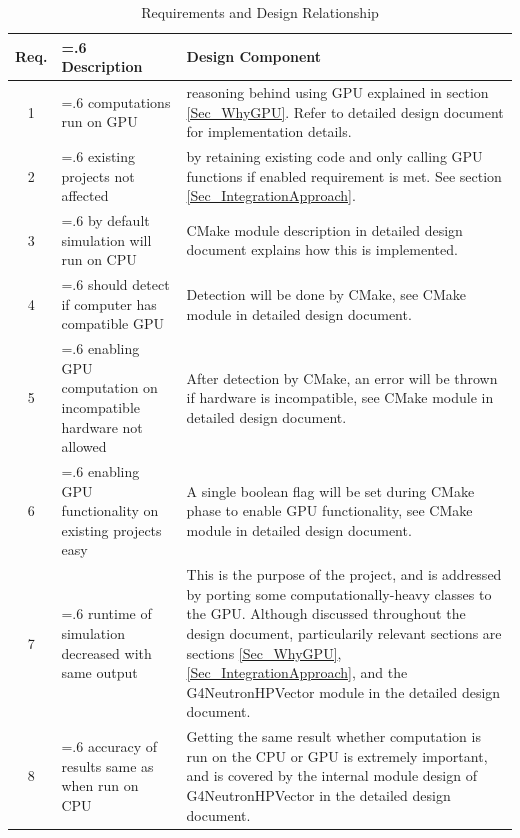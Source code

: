 \documentclass[12pt]{article}
\begin{document}
\begin{table}[h]
\centering
\caption{Requirements and Design Relationship}\label{Table_RequirementsAndDesign}

\begin{tabularx}{\textwidth}{c>{\hsize=.6\hsize}X>{\hsize=1.4\hsize}X}
\toprule
\bf Req. & \bf Description & \bf Design Component\\\midrule
\arrayrulecolor{lightgray}
1  & computations run on GPU & reasoning behind using GPU explained in section \ref{Sec_WhyGPU}. Refer to detailed design document for implementation details.\\\hline

2  & existing projects not affected & by retaining existing code and only calling GPU functions if enabled requirement is met. See section \ref{Sec_IntegrationApproach}.\\\hline

3  & by default simulation will run on CPU & CMake module description in detailed design document explains how this is implemented.\\\hline

4  & should detect if computer has compatible GPU & Detection will be done by CMake, see CMake module in detailed design document.\\\hline

5  & enabling GPU computation on incompatible hardware not allowed & After detection by CMake, an error will be thrown if hardware is incompatible, see CMake module in detailed design document.\\\hline

6  & enabling GPU functionality on existing projects easy & A single boolean flag will be set during CMake phase to enable GPU functionality, see CMake module in detailed design document.\\\hline

7 & runtime of simulation decreased with same output & This is the purpose of the project, and is addressed by porting some computationally-heavy classes to the GPU. Although discussed throughout the design document, particularily relevant sections are sections \ref{Sec_WhyGPU}, \ref{Sec_IntegrationApproach}, and the G4NeutronHPVector module in the detailed design document.\\\hline

8 & accuracy of results same as when run on CPU & Getting the same result whether computation is run on the CPU or GPU is extremely important, and is covered by the internal module design of G4NeutronHPVector in the detailed design document.\\\hline


\end{tabularx}
\end{table}
\end{document}
